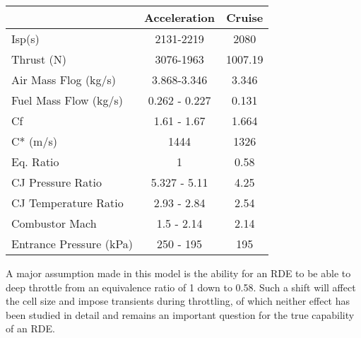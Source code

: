 \begin{center}
\begin{tabular}{l c c}
& Acceleration & Cruise \\
\hline
Isp(s) & 2131-2219 & 2080 \\
Thrust (N) & 3076-1963 & 1007.19 \\
Air Mass Flog (kg/s) & 3.868-3.346 & 3.346 \\
Fuel Mass Flow (kg/s) & 0.262 - 0.227 & 0.131 \\
Cf & 1.61 - 1.67 & 1.664 \\
C* (m/s) & 1444 & 1326 \\
Eq. Ratio & 1 & 0.58 \\
CJ Pressure Ratio & 5.327 - 5.11 & 4.25 \\
CJ Temperature Ratio & 2.93 - 2.84 & 2.54 \\
Combustor Mach & 1.5 - 2.14 & 2.14 \\
Entrance Pressure (kPa) & 250 - 195 & 195
\end{tabular}
\end{center}

    A major assumption made in this model is the ability for an RDE to be able to deep throttle from an equivalence ratio of 1 down to 0.58. Such a shift will affect the cell size and impose transients during throttling, of which neither effect has been studied in detail and remains an important question for the true capability of an RDE. 
